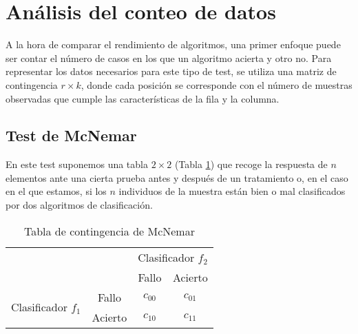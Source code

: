 \section{Análisis del conteo de datos}
	
	A la hora de comparar el rendimiento de algoritmos, una 
primer enfoque puede ser contar el número de casos en los que 
un algoritmo acierta y otro no. Para representar los datos 
necesarios para este tipo de test, se utiliza una matriz de 
contingencia $r \times k$, donde cada posición se corresponde 
con el número de muestras observadas que cumple las 
características de la fila y la columna.
	
\subsection{Test de McNemar}
	
	En este test suponemos una tabla $2 \times 2$ (Tabla \ref{Tb:McNemar}) que recoge 
la respuesta de $n$ elementos ante una cierta prueba antes y 
después de un tratamiento o, en el caso en el que estamos, si 
los $n$ individuos de la muestra están bien o mal 
clasificados por dos algoritmos de clasificación.
	
\begin{table}[H]
\centering
\caption{Tabla de contingencia de McNemar}
\label{Tb:McNemar}
\begin{tabular}{|lc|cc|}
\hline
                                                          &       & \multicolumn{2}{c|}{Clasificador $f_2$} \\ \cline{3-4} 
                                                          &         & Fallo              & Acierto            \\ \hline
\multicolumn{1}{|c|}{\multirow{2}{*}{Clasificador $f_1$}} & Fallo   & $c_{00}$           & $c_{01}$           \\
\multicolumn{1}{|c|}{}                                    & Acierto & $c_{10}$           & $c_{11}$           \\ \hline
\end{tabular}
\end{table}

